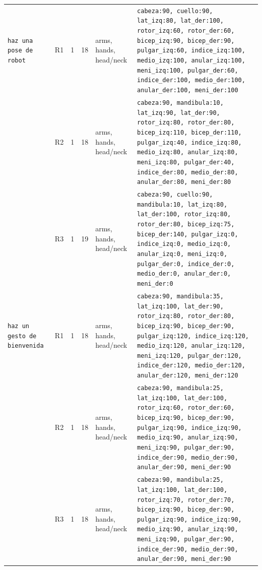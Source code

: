 \begin{table}[!tb]
{\begin{tabular}{llccp{2.4cm}p{6.4cm}}
    \hline
    \texttt{haz una pose de robot} & R1 & 1 & 18 & arms, hands, head/neck & \texttt{cabeza:90, cuello:90, lat\_izq:80, lat\_der:100, rotor\_izq:60, rotor\_der:60, bicep\_izq:90, bicep\_der:90, pulgar\_izq:60, indice\_izq:100, medio\_izq:100, anular\_izq:100, meni\_izq:100, pulgar\_der:60, indice\_der:100, medio\_der:100, anular\_der:100, meni\_der:100} \\
     & R2 & 1 & 18 & arms, hands, head/neck & \texttt{cabeza:90, mandibula:10, lat\_izq:90, lat\_der:90, rotor\_izq:80, rotor\_der:80, bicep\_izq:110, bicep\_der:110, pulgar\_izq:40, indice\_izq:80, medio\_izq:80, anular\_izq:80, meni\_izq:80, pulgar\_der:40, indice\_der:80, medio\_der:80, anular\_der:80, meni\_der:80} \\
     & R3 & 1 & 19 & arms, hands, head/neck & \texttt{cabeza:90, cuello:90, mandibula:10, lat\_izq:80, lat\_der:100, rotor\_izq:80, rotor\_der:80, bicep\_izq:75, bicep\_der:140, pulgar\_izq:0, indice\_izq:0, medio\_izq:0, anular\_izq:0, meni\_izq:0, pulgar\_der:0, indice\_der:0, medio\_der:0, anular\_der:0, meni\_der:0} \\
    \hline
    \texttt{haz un gesto de bienvenida} & R1 & 1 & 18 & arms, hands, head/neck & \texttt{cabeza:90, mandibula:35, lat\_izq:100, lat\_der:90, rotor\_izq:80, rotor\_der:80, bicep\_izq:90, bicep\_der:90, pulgar\_izq:120, indice\_izq:120, medio\_izq:120, anular\_izq:120, meni\_izq:120, pulgar\_der:120, indice\_der:120, medio\_der:120, anular\_der:120, meni\_der:120} \\
     & R2 & 1 & 18 & arms, hands, head/neck & \texttt{cabeza:90, mandibula:25, lat\_izq:100, lat\_der:100, rotor\_izq:60, rotor\_der:60, bicep\_izq:90, bicep\_der:90, pulgar\_izq:90, indice\_izq:90, medio\_izq:90, anular\_izq:90, meni\_izq:90, pulgar\_der:90, indice\_der:90, medio\_der:90, anular\_der:90, meni\_der:90} \\
     & R3 & 1 & 18 & arms, hands, head/neck & \texttt{cabeza:90, mandibula:25, lat\_izq:100, lat\_der:100, rotor\_izq:70, rotor\_der:70, bicep\_izq:90, bicep\_der:90, pulgar\_izq:90, indice\_izq:90, medio\_izq:90, anular\_izq:90, meni\_izq:90, pulgar\_der:90, indice\_der:90, medio\_der:90, anular\_der:90, meni\_der:90} \\
    \hline
  \end{tabular}%
  }
\end{table}

